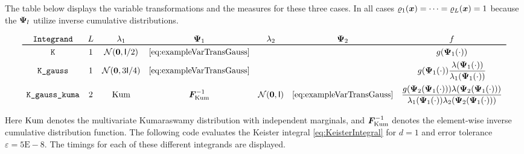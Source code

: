 \documentclass[graybox,footinfo]{svmult}
\newcommand{\mI}{\mathsf{I}}
\newcommand{\Kum}{\textup{Kum}}
\begin{document}
The table below displays the variable transformations and the measures for these three cases.  In all cases $\varrho_1({\boldsymbol{x}}) = \cdots = \varrho_L({\boldsymbol{x}}) = 1$ because the ${\boldsymbol{\Psi}}_l$ utilize inverse cumulative distributions.

\[\begin{array}{ccccccc}
	\texttt{Integrand} & L & \lambda_1 & \bsPsi_1 & \lambda_2 & \bsPsi_2 & f \tabularnewline
	\toprule
	\texttt{K} & 1 & \calN(\bszero, \mI/2) & \eqref{eq:exampleVarTransGauss}& && g(\bsPsi_1(\cdot)) \tabularnewline [1ex]
	\texttt{K\_gauss} & 1 & \calN(\bszero,3 \mI/4) & \eqref{eq:exampleVarTransGauss} & && 
	\displaystyle g(\bsPsi_1(\cdot)) \frac{\lambda(\bsPsi_1(\cdot))}{\lambda_1(\bsPsi_1(\cdot))} \tabularnewline [2.5ex]
	\texttt{K\_gauss\_kuma} & 2 & \Kum & \bsF^{-1}_\Kum & \calN(\bszero,\mI) &  \eqref{eq:exampleVarTransGauss} &
	\displaystyle \frac{g(\bsPsi_2(\bsPsi_1(\cdot))) \lambda(\bsPsi_2(\bsPsi_1(\cdot))) }{\lambda_1(\bsPsi_1(\cdot)) \lambda_2(\bsPsi_2(\bsPsi_1(\cdot)))} 
\end{array}
\]

Here $\Kum$ denotes the multivariate Kumaraswamy distribution with independent marginals, and $ \boldsymbol{F}^{-1}_\Kum$ denotes the element-wise inverse cumulative distribution function.  The following code evaluates the Keister integral \eqref{eq:KeisterIntegral} for $d=1$ and error tolerance $\varepsilon = 5\text{E}-8$.  The timings for each of these different integrands are displayed.


\end{document}
